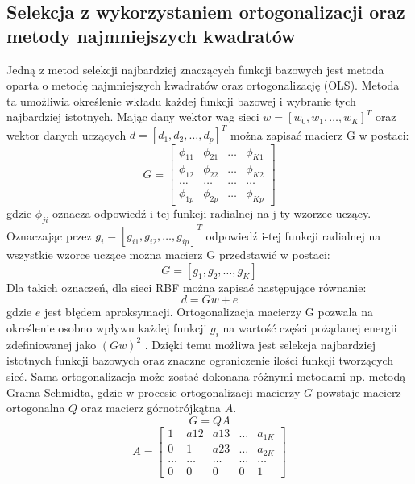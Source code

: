 \subsection{Selekcja z wykorzystaniem ortogonalizacji oraz metody najmniejszych kwadratów}
Jedną z metod selekcji najbardziej znaczących funkcji bazowych jest metoda oparta o metodę najmniejszych kwadratów oraz ortogonalizację (OLS)\cite{Chen}. Metoda ta umożliwia określenie wkładu każdej funkcji bazowej i wybranie tych najbardziej istotnych. Mając dany wektor wag sieci $w = [w_0, w_1, \hdots, w_K]^T$ oraz wektor danych uczących $d = [d_1, d_2, \hdots, d_p]^T$ można zapisać macierz G w postaci:
\begin{equation}
G = \begin{bmatrix}
\phi_{11} & \phi_{21} & \hdots & \phi_{K1} \\
\phi_{12} & \phi_{22} & \hdots & \phi_{K2} \\
\hdots    & \hdots    & \hdots & \hdots    \\
\phi_{1p} & \phi_{2p} & \hdots & \phi_{Kp}
\end{bmatrix}
\end{equation}
gdzie $\phi_{ji}$ oznacza odpowiedź i-tej funkcji radialnej na j-ty wzorzec uczący. Oznaczając przez $g_i = [g_{i1}, g_{i2}, \hdots, g_{ip}]^T$ odpowiedź i-tej funkcji radialnej na wszystkie wzorce uczące można macierz G przedstawić w postaci:
\begin{equation}G = [g_1, g_2, \hdots, g_K] \end{equation}
Dla takich oznaczeń, dla sieci RBF można zapisać następujące równanie:
\begin{equation}
\label{wzor:ofr_rbf}
d = Gw + e\end
{equation}
gdzie $e$ jest błędem aproksymacji. Ortogonalizacja macierzy G pozwala na określenie osobno wpływu każdej funkcji $g_i$ na wartość części pożądanej energii zdefiniowanej jako $(Gw)^2$ \cite{Osowski}. Dzięki temu możliwa jest selekcja najbardziej istotnych funkcji bazowych oraz znaczne ograniczenie ilości funkcji tworzących sieć. Sama ortogonalizacja może zostać dokonana różnymi metodami np. metodą Grama-Schmidta, gdzie w procesie ortogonalizacji macierzy $G$ powstaje macierz ortogonalna $Q$ oraz macierz górnotrójkątna $A$.
\begin{equation}G = QA\end{equation}
\begin{equation}
A = \begin{bmatrix}
1      & a{12}  & a{13}  & \hdots & a_{1K} \\
0      & 1      & a{23}  & \hdots & a_{2K} \\
\hdots & \hdots & \hdots & \hdots & \hdots \\
0      & 0      & 0      & 0      & 1     
\end{bmatrix}
\end{equation}
